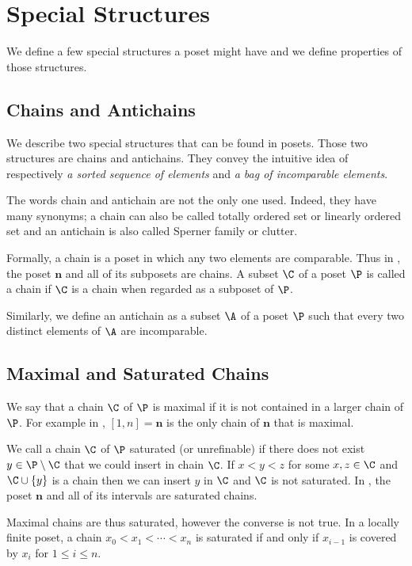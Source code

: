 \section{Special Structures}

We define a few special structures a poset might have and we define properties
of those structures.

\subsection{Chains and Antichains}

We describe two special structures that can be found in
posets. Those two structures are chains and antichains.
They convey the intuitive idea of respectively \emph{a sorted sequence of
elements} and \emph{a bag of incomparable elements}.

The words chain and antichain are not the only one used.
Indeed, they have many synonyms; a chain can also be called
totally ordered set or linearly ordered set and an
antichain is also called Sperner family or
clutter.


Formally, a chain is a poset in which any two elements are
comparable. Thus in , the poset $\bm{n}$ and all of its
subposets are chains. A subset $\C$ of a poset $\P$ is called a chain if $\C$ is a
chain when regarded as a subposet of $\P$.

Similarly, we define an antichain as a subset $\A$ of a poset $\P$ such
that every two distinct elements of $\A$ are incomparable.

\subsection{Maximal and Saturated Chains}

We say that a chain \(\C\) of \(\P\) is maximal if it is not contained in a larger
chain of $\P$. For example in , $[1, n] = \bm{n}$ is the
only chain of $\bm{n}$ that is maximal.

We call a chain $\C$ of $\P$ saturated (or unrefinable) if there does not exist
$y \in \P \setminus \C$ that we could insert in chain $\C$. If $x < y < z$ for
some $x, z \in \C$ and $\C \cup \left\{{y}\right\}$ is a chain then we can insert
$y$ in $\C$ and $\C$ is not saturated. In , the poset
$\bm{n}$ and all of its intervals are saturated chains.

Maximal chains are thus saturated, however the converse is not true. In a
locally finite poset, a chain $x_0 < x_1 < \cdots < x_n$ is saturated if and
only if $x_{i-1}$ is covered by $x_i$ for $1 \le i \le n$.


